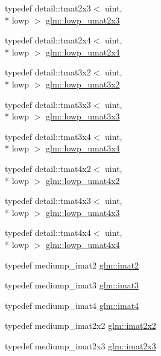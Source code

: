 \begin{DoxyCompactItemize}
\item 
typedef detail\-::tmat2x3$<$ uint, \\*
lowp $>$ \hyperlink{group__gtc__matrix__integer_ga4c8388c4a03f228c0e12dd7b7445115d}{glm\-::lowp\-\_\-umat2x3}
\item 
typedef detail\-::tmat2x4$<$ uint, \\*
lowp $>$ \hyperlink{group__gtc__matrix__integer_ga581eef861234e918e88377fd331e37e6}{glm\-::lowp\-\_\-umat2x4}
\item 
typedef detail\-::tmat3x2$<$ uint, \\*
lowp $>$ \hyperlink{group__gtc__matrix__integer_ga5874e964b1816f230215df28d22ea7de}{glm\-::lowp\-\_\-umat3x2}
\item 
typedef detail\-::tmat3x3$<$ uint, \\*
lowp $>$ \hyperlink{group__gtc__matrix__integer_ga691694b1a4c6d1e613d8f1f707acc829}{glm\-::lowp\-\_\-umat3x3}
\item 
typedef detail\-::tmat3x4$<$ uint, \\*
lowp $>$ \hyperlink{group__gtc__matrix__integer_gad44577fcaebad47da39cc244566d7fe3}{glm\-::lowp\-\_\-umat3x4}
\item 
typedef detail\-::tmat4x2$<$ uint, \\*
lowp $>$ \hyperlink{group__gtc__matrix__integer_ga7583563f93096623d54ec8fddd806d13}{glm\-::lowp\-\_\-umat4x2}
\item 
typedef detail\-::tmat4x3$<$ uint, \\*
lowp $>$ \hyperlink{group__gtc__matrix__integer_ga03af6e7ea92be81959305fc89a239cf5}{glm\-::lowp\-\_\-umat4x3}
\item 
typedef detail\-::tmat4x4$<$ uint, \\*
lowp $>$ \hyperlink{group__gtc__matrix__integer_ga394ee910348beffe9c7d6b694d5efe5f}{glm\-::lowp\-\_\-umat4x4}
\item 
typedef mediump\-\_\-imat2 \hyperlink{group__gtc__matrix__integer_ga77a581b3366fb63fc72f8f20830003e0}{glm\-::imat2}
\item 
typedef mediump\-\_\-imat3 \hyperlink{group__gtc__matrix__integer_ga45481922dd07a3a8e23758286311ee97}{glm\-::imat3}
\item 
typedef mediump\-\_\-imat4 \hyperlink{group__gtc__matrix__integer_ga40fc5c5e0b07543497aa1c314891544a}{glm\-::imat4}
\item 
typedef mediump\-\_\-imat2x2 \hyperlink{group__gtc__matrix__integer_gaf7f44f44d966377666d41ed059524732}{glm\-::imat2x2}
\item 
typedef mediump\-\_\-imat2x3 \hyperlink{group__gtc__matrix__integer_ga143bc5177bac9991d84b70da03952516}{glm\-::imat2x3}

\end{DoxyCompactItemize}
